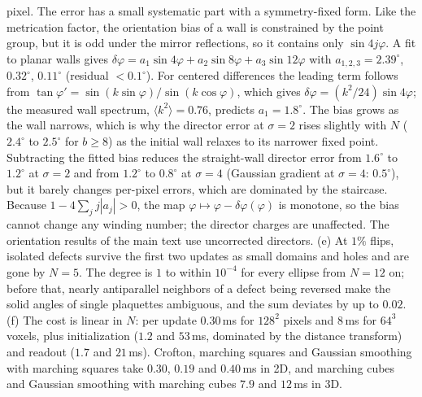 \documentclass[11pt,a4paper]{article}
\begin{document}
pixel. The error has a small systematic part with a symmetry-fixed form. Like the metrication factor, the orientation bias of a wall is constrained by the point group, but it is odd under the mirror reflections, so it contains only $\sin4j\varphi$. A fit to planar walls gives $\delta\varphi=a_1\sin4\varphi+a_2\sin8\varphi+a_3\sin12\varphi$ with $a_{1,2,3}=2.39^\circ$, $0.32^\circ$, $0.11^\circ$ (residual $<0.1^\circ$). For centered differences the leading term follows from $\tan\varphi'=\sin(k\sin\varphi)/\sin(k\cos\varphi)$, which gives $\delta\varphi=(k^2/24)\sin4\varphi$; the measured wall spectrum, $\langle k^2\rangle=0.76$, predicts $a_1=1.8^\circ$. The bias grows as the wall narrows, which is why the director error at $\sigma=2$ rises slightly with $N$ ($2.4^\circ$ to $2.5^\circ$ for $b\ge8$) as the initial wall relaxes to its narrower fixed point. Subtracting the fitted bias reduces the straight-wall director error from $1.6^\circ$ to $1.2^\circ$ at $\sigma=2$ and from $1.2^\circ$ to $0.8^\circ$ at $\sigma=4$ (Gaussian gradient at $\sigma=4$: $0.5^\circ$), but it barely changes per-pixel errors, which are dominated by the staircase. Because $1-4\sum_j j|a_j|>0$, the map $\varphi\mapsto\varphi-\delta\varphi(\varphi)$ is monotone, so the bias cannot change any winding number; the director charges are unaffected. The orientation results of the main text use uncorrected directors. (e) At $1\%$ flips, isolated defects survive the first two updates as small domains and holes and are gone by $N=5$. The degree is $1$ to within $10^{-4}$ for every ellipse from $N=12$ on; before that, nearly antiparallel neighbors of a defect being reversed make the solid angles of single plaquettes ambiguous, and the sum deviates by up to $0.02$. (f) The cost is linear in $N$: per update $0.30$\,ms for $128^2$ pixels and $8$\,ms for $64^3$ voxels, plus initialization ($1.2$ and $53$\,ms, dominated by the distance transform) and readout ($1.7$ and $21$\,ms). Crofton, marching squares and Gaussian smoothing with marching squares take $0.30$, $0.19$ and $0.40$\,ms in 2D, and marching cubes and Gaussian smoothing with marching cubes $7.9$ and $12$\,ms in 3D.
\end{document}
